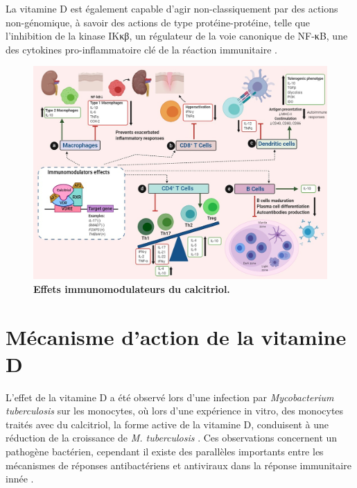 \documentclass[
  a4paper,
  DIV=11,
  numbers=noendperiod,
  listof=totoc]{scrreprt}
\begin{document}
La vitamine D est également capable d'agir non-classiquement par des
actions non-génomique, à savoir des actions de type protéine-protéine,
telle que l'inhibition de la kinase IKκβ, un régulateur de la voie
canonique de NF-κB, une des cytokines pro-inflammatoire clé de la
réaction immunitaire \autocite{Hii.2016}.

\begin{figure}
\includegraphics{figures/calcitriol-immunomodulatory.jpg} 
\caption[\textbf{Effets immunomodulateurs du calcitriol.}]
{\textbf{Effets immunomodulateurs du calcitriol.} \cite{Meza-Meza.2020}
\label{fig:immunomod}
}
\end{figure}

\hypertarget{muxe9canisme-daction-de-la-vitamine-d}{%
\section{Mécanisme d'action de la vitamine
D}\label{muxe9canisme-daction-de-la-vitamine-d}}

L'effet de la vitamine D a été observé lors d'une infection par
\emph{Mycobacterium tuberculosis} sur les monocytes, où lors d'une
expérience in vitro, des monocytes traités avec du calcitriol, la forme
active de la vitamine D, conduisent à une réduction de la croissance de
\emph{M. tuberculosis} \autocite{Hewison.2011}. Ces observations
concernent un pathogène bactérien, cependant il existe des parallèles
importants entre les mécanismes de réponses antibactériens et antiviraux
dans la réponse immunitaire innée \autocite{White.2022}.
\end{document}
